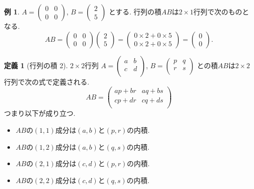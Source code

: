 \documentclass[dvipdfmx,a4paper,11pt]{article}
\theoremstyle{definition}
\newtheorem{dfn}[thm]{定義}
\newtheorem{exa}[thm]{例}
\begin{document}
   \begin{exa}
 $ A= 
 \begin{pmatrix}
0 & 0\\
0 & 0
 \end{pmatrix}
 $, $
 B = 
 \begin{pmatrix}
2 \\5
 \end{pmatrix}
 $
 とする. 
 行列の積$AB$は$2 \times 1$行列で次のものとなる.  
 $$
 AB = 
 \begin{pmatrix}
0 & 0\\
0 & 0
 \end{pmatrix}
  \begin{pmatrix}
2 \\5
 \end{pmatrix}
 =  
 \begin{pmatrix}
0\times 2 + 0\times 5 \\
0\times 2 + 0 \times 5
 \end{pmatrix}
 = 
  \begin{pmatrix}
0 \\0
 \end{pmatrix}.
 $$
 
 \end{exa}
 

 
 
  \begin{tcolorbox}[
    colback = white,
    colframe = green!35!black,
    fonttitle = \bfseries,
    breakable = true]
    \begin{dfn}[行列の積 2]
    
$2 \times 2$行列
$
A=\begin{pmatrix}
a& b \\
c& d \\
\end{pmatrix}
$,
$
B=
\begin{pmatrix}
p& q \\
r& s\\
\end{pmatrix}
$
との積$AB$は$2 \times 2$行列で次の式で定義される.
$$
AB =
\begin{pmatrix}
ap + br & aq + bs \\
cp + dr& cq + ds\\
\end{pmatrix}
$$
つまり以下が成り立つ.
\begin{itemize}
	\setlength{\parskip}{0cm}
  	\setlength{\itemsep}{0pt} 
\item $AB$の$(1,1)$成分は$(a,b)$と$(p,r)$の内積.
\item $AB$の$(1,2)$成分は$(a,b)$と$(q,s)$の内積.
\item $AB$の$(2,1)$成分は$(c,d)$と$(p,r)$の内積.
\item $AB$の$(2,2)$成分は$(c,d)$と$(q,s)$の内積.
\end{itemize}
  \end{dfn}
 \end{tcolorbox}
 
\end{document}
